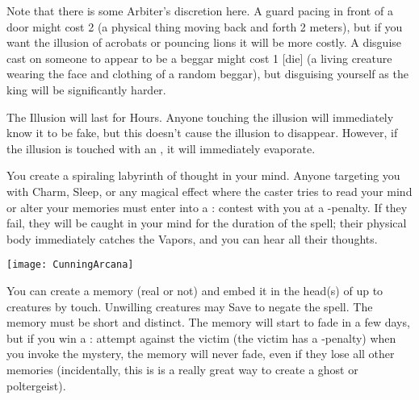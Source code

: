 {Note that there is some Arbiter's discretion here.  A guard pacing in front of a door might cost 2 \DICE (a physical thing moving back and forth 2
meters), but if you want the illusion of acrobats or pouncing lions it will be more costly.  A disguise cast on someone to appear to be a beggar might
cost 1 [die] (a living creature wearing the face and clothing of a random beggar), but disguising yourself as the king will be significantly harder.

The Illusion will last for \DICE Hours.  Anyone touching the illusion will immediately know it to be fake, but this doesn't cause the illusion to
disappear.  However, if the illusion is touched with an , it will immediately evaporate.

\MYSTERY [
  Name = Labyrinth,
  Link = arcana-mystery-labyrinth,
  Paradigm = Mind,
  Save = N,
  Duration = Combat or \SUM Minutes,
  Target = Self
]

You create a spiraling labyrinth of thought in your mind.  Anyone targeting you with Charm, Sleep, or any magical effect where the caster tries to read your mind or alter your memories must enter into a \RB : \FOC contest with you at a -\DICE penalty.  If they fail, they will be caught in your mind for the duration of the spell;  their physical body immediately catches the Vapors, and you can hear all their thoughts.

  \begin{center}
  \texttt{[image: CunningArcana]}
  \end{center}



\MYSTERY [
  Name = Memory Lane,
  Link = arcana-mystery-memory-lane,
  Paradigm = Mind,
  Save = Y (neg.),
  Duration = Varies,
  Target = Close Target(s)
]

You can create a memory (real or not) and embed it in the head(s) of up to \DICE creatures by touch.  Unwilling creatures may Save to negate the spell.  The memory must be short and distinct.  The memory will start to fade in a few days, but if you win a \RB : \FOC attempt against the victim (the victim has a -\DICE penalty) when you invoke the mystery, the memory will never fade, even if they lose all other memories (incidentally, this is is a really great way to create a ghost or poltergeist).

\MYSTERY [
  Name = Mirror Image,
  Link = arcana-mystery-mirror-image,
  Paradigm = Mind,
  Save = n/a,
  Duration = Minutes,
  Target = Self
]

}
